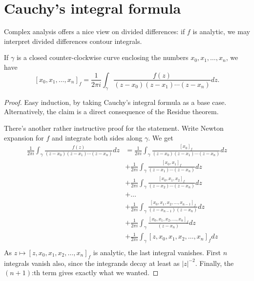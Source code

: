 \section{Cauchy's integral formula}

Complex analysis offers a nice view on divided differences: if $f$ is analytic, we may interpret divided differences contour integrals.

\begin{lem}\label{div_cauchy}
If $\gamma$ is a closed counter-clockwise curve enclosing the numbers $x_{0}, x_{1}, \ldots, x_{n}$, we have
\[
	[x_{0}, x_{1}, \ldots, x_{n}]_{f} = \frac{1}{2 \pi i} \int_{\gamma} \frac{f(z)}{(z - x_{0})(z - x_{1}) \cdots (z - x_{n})} dz.
\]
\end{lem}
\begin{proof}
Easy induction, by taking Cauchy's integral formula as a base case. Alternatively, the claim is a direct consequence of the Residue theorem.

There's another rather instructive proof for the statement. Write Newton expansion for $f$ and integrate both sides along $\gamma$. We get
\begin{align*}
	\frac{1}{2 \pi i} \int_{\gamma} \frac{f(z)}{(z - x_{0})(z - x_{1}) \cdots (z - x_{n})} dz &= \frac{1}{2 \pi i} \int_{\gamma} \frac{[x_{0}]_{f}}{(z - x_{0})(z - x_{1}) \cdots (z - x_{n})} dz \\
	&+ \frac{1}{2 \pi i} \int_{\gamma} \frac{[x_{0}, x_{1}]_{f}}{(z - x_{1}) \cdots (z - x_{n})} dz \\
	&+ \frac{1}{2 \pi i} \int_{\gamma} \frac{[x_{0}, x_{1}, x_{2}]_{f}}{(z - x_{2}) \cdots (z - x_{n})} dz \\
	&+ \ldots \\
	&+ \frac{1}{2 \pi i} \int_{\gamma} \frac{[x_{0}, x_{1}, x_{2}, \ldots, x_{n - 1}]_{f}}{(z - x_{n - 1})(z - x_{n})} dz \\
	&+ \frac{1}{2 \pi i} \int_{\gamma} \frac{[x_{0}, x_{1}, x_{2}, \ldots, x_{n}]_{f}}{(z - x_{n})} dz \\
	&+ \frac{1}{2 \pi i} \int_{\gamma} [z, x_{0}, x_{1}, x_{2}, \ldots, x_{n}]_{f} dz \\
\end{align*}
As $z \mapsto [z, x_{0}, x_{1}, x_{2}, \ldots, x_{n}]_{f}$ is analytic, the last integral vanishes. First $n$ integrals vanish also, since the integrands decay at least as $|z|^{-2}$. Finally, the $(n + 1)$:th term gives exactly what we wanted.
\end{proof}

